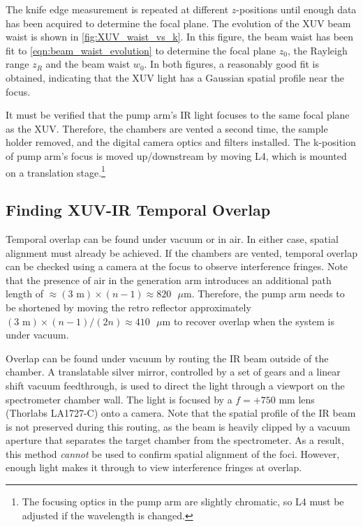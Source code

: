 The knife edge measurement is repeated at different $z$-positions until enough data has been acquired to determine the focal plane. The evolution of the XUV beam waist is shown in \cref{fig:XUV_waist_vs_k}. In this figure, the beam waist has been fit to \cref{eqn:beam_waist_evolution} to determine the focal plane $z_0$, the Rayleigh range $z_R$ and the beam waist $w_0$. In both figures, a reasonably good fit is obtained, indicating that the XUV light has a Gaussian spatial profile near the focus.

It must be verified that the pump arm's IR light focuses to the same focal plane as the XUV. Therefore, the chambers are vented a second time, the sample holder removed, and the digital camera optics and filters installed. The k-position of pump arm's focus is moved up/downstream by moving L4, which is mounted on a translation stage.\footnote{The focusing optics in the pump arm are slightly chromatic, so L4 must be adjusted if the wavelength is changed.}

\subsection{Finding XUV-IR Temporal Overlap}

Temporal overlap can be found under vacuum or in air. In either case, spatial alignment must already be achieved. If the chambers are vented, temporal overlap can be checked using a camera at the focus to observe interference fringes. Note that the presence of air in the generation arm introduces an additional path length of $\approx (\text{3 m}) \times (n-1) \approx 820 \text{ } \mu \text{m}$. Therefore, the pump arm needs to be shortened by moving the retro reflector approximately $(\text{3 m}) \times (n-1)/(2n) \approx 410 \text{ } \mu \text{m}$ to recover overlap when the system is under vacuum.

Overlap can be found under vacuum by routing the IR beam outside of the chamber. A translatable silver mirror, controlled by a set of gears and a linear shift vacuum feedthrough, is used to direct the light through a viewport on the spectrometer chamber wall. The light is focused by a $f = +750$ mm lens (Thorlabs LA1727-C) onto a camera. Note that the spatial profile of the IR beam is not preserved during this routing, as the beam is heavily clipped by a vacuum aperture that separates the target chamber from the spectrometer. As a result, this method \textit{cannot} be used to confirm spatial alignment of the foci. However, enough light makes it through to view interference fringes at overlap. 

